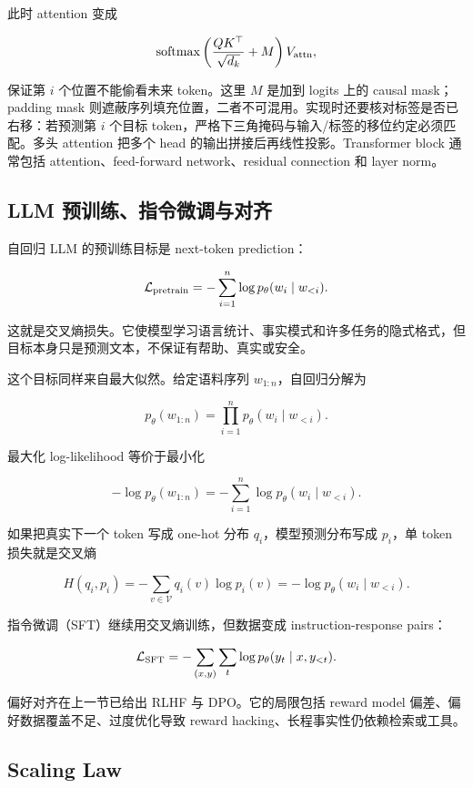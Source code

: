 此时 attention 变成

\[
  \operatorname{softmax}
  \left(
    \frac{QK^\top}{\sqrt{d_k}}+M
  \right)V_{\mathrm{attn}},
\]

保证第 \(i\) 个位置不能偷看未来 token。这里 \(M\) 是加到 logits 上的 causal mask；padding mask 则遮蔽序列填充位置，二者不可混用。实现时还要核对标签是否已右移：若预测第 \(i\) 个目标 token，严格下三角掩码与输入/标签的移位约定必须匹配。多头 attention 把多个 head 的输出拼接后再线性投影。Transformer block 通常包括 attention、feed-forward network、residual connection 和 layer norm。

\subsection{LLM 预训练、指令微调与对齐}


自回归 LLM 的预训练目标是 next-token prediction：

\[
  \mathcal{L}_{\mathrm{pretrain}}
  =
  -
  \sum_{i=1}^{n}
  \log p_\theta(w_i\mid w_{<i}).
\]

这就是交叉熵损失。它使模型学习语言统计、事实模式和许多任务的隐式格式，但目标本身只是预测文本，不保证有帮助、真实或安全。

这个目标同样来自最大似然。给定语料序列 \(w_{1:n}\)，自回归分解为

\[
  p_\theta(w_{1:n})
  =
  \prod_{i=1}^{n}p_\theta(w_i\mid w_{<i}).
\]

最大化 log-likelihood 等价于最小化

\[
  -\log p_\theta(w_{1:n})
  =
  -
  \sum_{i=1}^{n}
  \log p_\theta(w_i\mid w_{<i}).
\]

如果把真实下一个 token 写成 one-hot 分布 \(q_i\)，模型预测分布写成 \(p_i\)，单 token 损失就是交叉熵

\[
  H(q_i,p_i)
  =
  -
  \sum_{v\in\mathcal{V}}q_i(v)\log p_i(v)
  =
  -\log p_\theta(w_i\mid w_{<i}).
\]

指令微调（SFT）继续用交叉熵训练，但数据变成 instruction-response pairs：

\[
  \mathcal{L}_{\mathrm{SFT}}
  =
  -
  \sum_{(x,y)}
  \sum_{t}
  \log p_\theta(y_t\mid x,y_{<t}).
\]

偏好对齐在上一节已给出 RLHF 与 DPO。它的局限包括 reward model 偏差、偏好数据覆盖不足、过度优化导致 reward hacking、长程事实性仍依赖检索或工具。

\subsection{Scaling Law}

